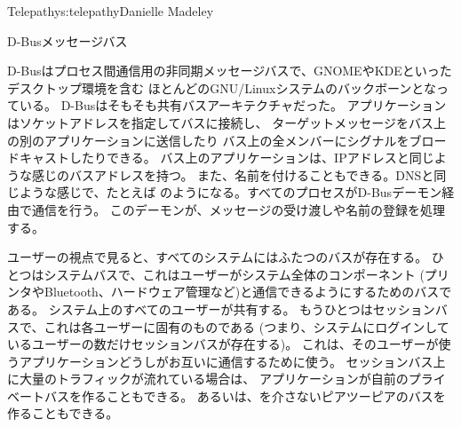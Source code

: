 \begin{aosachapter}{Telepathy}{s:telepathy}{Danielle Madeley}
\begin{aosabox}{D-Busメッセージバス}

D-Busはプロセス間通信用の非同期メッセージバスで、GNOMEやKDEといったデスクトップ環境を含む
ほとんどのGNU/Linuxシステムのバックボーンとなっている。
D-Busはそもそも共有バスアーキテクチャだった。
アプリケーションはソケットアドレスを指定してバスに接続し、
ターゲットメッセージをバス上の別のアプリケーションに送信したり
バス上の全メンバーにシグナルをブロードキャストしたりできる。
バス上のアプリケーションは、IPアドレスと同じような感じのバスアドレスを持つ。
また、名前を付けることもできる。DNSと同じような感じで、たとえば
のようになる。すべてのプロセスがD-Busデーモン経由で通信を行う。
このデーモンが、メッセージの受け渡しや名前の登録を処理する。

ユーザーの視点で見ると、すべてのシステムにはふたつのバスが存在する。
ひとつはシステムバスで、これはユーザーがシステム全体のコンポーネント
(プリンタやBluetooth、ハードウェア管理など)と通信できるようにするためのバスである。
システム上のすべてのユーザーが共有する。
もうひとつはセッションバスで、これは各ユーザーに固有のものである
(つまり、システムにログインしているユーザーの数だけセッションバスが存在する)。
これは、そのユーザーが使うアプリケーションどうしがお互いに通信するために使う。
セッションバス上に大量のトラフィックが流れている場合は、
アプリケーションが自前のプライベートバスを作ることもできる。
あるいは、を介さないピアツーピアのバスを作ることもできる。


\end{aosabox}
\end{aosachapter}
